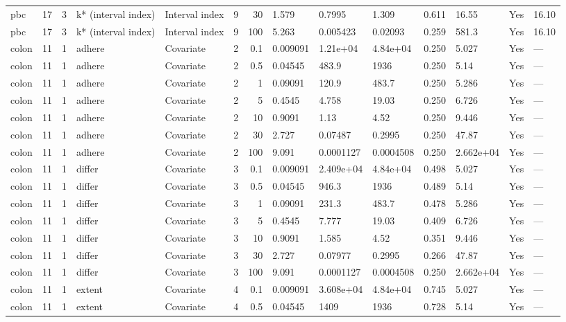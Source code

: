 \begin{tabular}{lrlllrrlllllll}
  pbc & 17 & 3 & k* (interval index) & Interval index & 9 &    30 & 1.579 & 0.7995 & 1.309 & 0.611 & 16.55 & Yes & 16.10 \\ 
  pbc & 17 & 3 & k* (interval index) & Interval index & 9 &   100 & 5.263 & 0.005423 & 0.02093 & 0.259 & 581.3 & Yes & 16.10 \\ 
  colon & 11 & 1 & adhere & Covariate & 2 &   0.1 & 0.009091 & 1.21e+04 & 4.84e+04 & 0.250 & 5.027 & Yes & --- \\ 
  colon & 11 & 1 & adhere & Covariate & 2 &   0.5 & 0.04545 & 483.9 & 1936 & 0.250 & 5.14 & Yes & --- \\ 
  colon & 11 & 1 & adhere & Covariate & 2 &     1 & 0.09091 & 120.9 & 483.7 & 0.250 & 5.286 & Yes & --- \\ 
  colon & 11 & 1 & adhere & Covariate & 2 &     5 & 0.4545 & 4.758 & 19.03 & 0.250 & 6.726 & Yes & --- \\ 
  colon & 11 & 1 & adhere & Covariate & 2 &    10 & 0.9091 & 1.13 & 4.52 & 0.250 & 9.446 & Yes & --- \\ 
  colon & 11 & 1 & adhere & Covariate & 2 &    30 & 2.727 & 0.07487 & 0.2995 & 0.250 & 47.87 & Yes & --- \\ 
  colon & 11 & 1 & adhere & Covariate & 2 &   100 & 9.091 & 0.0001127 & 0.0004508 & 0.250 & 2.662e+04 & Yes & --- \\ 
  colon & 11 & 1 & differ & Covariate & 3 &   0.1 & 0.009091 & 2.409e+04 & 4.84e+04 & 0.498 & 5.027 & Yes & --- \\ 
  colon & 11 & 1 & differ & Covariate & 3 &   0.5 & 0.04545 & 946.3 & 1936 & 0.489 & 5.14 & Yes & --- \\ 
  colon & 11 & 1 & differ & Covariate & 3 &     1 & 0.09091 & 231.3 & 483.7 & 0.478 & 5.286 & Yes & --- \\ 
  colon & 11 & 1 & differ & Covariate & 3 &     5 & 0.4545 & 7.777 & 19.03 & 0.409 & 6.726 & Yes & --- \\ 
  colon & 11 & 1 & differ & Covariate & 3 &    10 & 0.9091 & 1.585 & 4.52 & 0.351 & 9.446 & Yes & --- \\ 
  colon & 11 & 1 & differ & Covariate & 3 &    30 & 2.727 & 0.07977 & 0.2995 & 0.266 & 47.87 & Yes & --- \\ 
  colon & 11 & 1 & differ & Covariate & 3 &   100 & 9.091 & 0.0001127 & 0.0004508 & 0.250 & 2.662e+04 & Yes & --- \\ 
  colon & 11 & 1 & extent & Covariate & 4 &   0.1 & 0.009091 & 3.608e+04 & 4.84e+04 & 0.745 & 5.027 & Yes & --- \\ 
  colon & 11 & 1 & extent & Covariate & 4 &   0.5 & 0.04545 & 1409 & 1936 & 0.728 & 5.14 & Yes & --- \\ 

\end{tabular}
